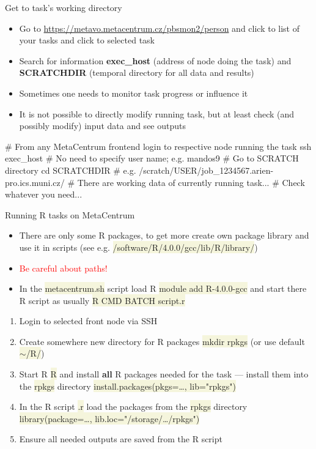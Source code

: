 \documentclass[compress, xelatex, 11pt, xcolor=svgnames, aspectratio=169,
	hyperref={
		bookmarks=true,
		unicode=true,
		colorlinks=true,
		pdftitle={Linux, command line and MetaCentrum},
		plainpages=false,
		pdfauthor={Vojtech Zeisek},
		pdfsubject={Course about use of Linux command line, writing shell scripts and using MetaCentrum of CESNET},
		pdfcreator={XeLaTeX},
		pdfkeywords={Linux, GNU, BASH, shell, command line, MetaCentrum},
		linkcolor=DarkRed, %
		anchorcolor=DarkBlue, %
		citecolor=Indigo, %
		filecolor=NavyBlue, %
		menucolor=DarkMagenta, %
		urlcolor=DarkBlue, %
		},
	url={hyphens, lowtilde} %
	]{beamer}
\renewcommand{\texttt}[1]{\colorbox{Beige}{{\ttfamily #1}}}
\renewcommand{\alert}[1]{\textcolor{red}{#1}}
\begin{document}
\begin{frame}[fragile]{Get to task's working directory}
	\begin{itemize}
		\item Go to \url{https://metavo.metacentrum.cz/pbsmon2/person} and click to list of your tasks and click to selected task
		\item Search for information \textbf{exec\_host} (address of node doing the task) and \textbf{SCRATCHDIR} (temporal directory for all data and results)
		\item Sometimes one needs to monitor task progress or influence it
		\item It is not possible to directly modify running task, but at least check (and possibly modify) input data and see outputs
	\end{itemize}
	\begin{bashcode}
    # From any MetaCentrum frontend login to respective node running the task
    ssh exec_host # No need to specify user name; e.g. mandos9
    # Go to SCRATCH directory
    cd SCRATCHDIR # e.g. /scratch/USER/job_1234567.arien-pro.ics.muni.cz/
    # There are working data of currently running task...
    # Check whatever you need...
	\end{bashcode}
\end{frame}

\begin{frame}{Running R tasks on MetaCentrum}
	\begin{itemize}
		\item There are only some R packages, to get more create own package library and use it in scripts (see e.g. \texttt{/software/R/4.0.0/gcc/lib/R/library/})
		\item \alert{Be careful about paths!}
		\item In the \texttt{metacentrum.sh} script load R \texttt{module add R-4.0.0-gcc} and start there R script as usually \texttt{R CMD BATCH script.r}
	\end{itemize}
	\begin{enumerate}
		\item Login to selected front node via SSH
		\item Create somewhere new directory for R packages \texttt{mkdir rpkgs} (or use default \texttt{$\sim$/R/})
		\item Start R \texttt{R} and install \textbf{all} R packages needed for the task --- install them into the \texttt{rpkgs} directory \texttt{install.packages(pkgs=\ldots, lib="rpkgs")}
		\item In the R script \texttt{*.r} load the packages from the \texttt{rpkgs} directory \texttt{library(package=\ldots, lib.loc="/storage/\ldots/rpkgs")}
		\item Ensure all needed outputs are saved from the R script
	\end{enumerate}
\end{frame}
\end{document}
